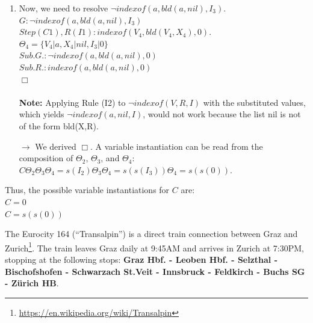 \documentclass[10pt, a4paper]{article}
\begin{document}
\begin{enumerate}
    \item Now, we need to resolve $\neg indexof(a, bld(a, nil), I_3)$. \\
    $G: \neg indexof(a, bld(a, nil), I_3)$ \\
    $Step(C1), R(I1): indexof(V_4, bld(V_4, X_4), 0).$ \\
    $\Theta_4 = \{V_4 | a, X_4 | nil, I_3 | 0\}$ \\
    $Sub.G.: \neg indexof(a, bld(a, nil), 0)$ \\
    $Sub.R.: indexof(a, bld(a, nil), 0) $ \\
    $\Box$ \\
    \\
    
  \textbf{Note: }Applying Rule (I2) to $\neg indexof(V,R,I)$ with the substituted values, which yields  $\neg indexof(a,nil,I)$, would not work because the list nil is not of the form bld(X,R).
    
 $\rightarrow$ We derived $\Box$. A variable instantiation can be read from the composition of $\Theta_2$, $\Theta_3$, and $\Theta_4$: \\
 $C\Theta_2\Theta_3\Theta_4 = s(I_2)\Theta_3\Theta_4 = s(s(I_3))\Theta_4 = s(s(0))$.

\end{enumerate}

Thus, the possible variable instantiations for $C$ are: \\
$C=0$ \\
$C=s(s(0))$






The Eurocity 164 (“Transalpin”) is a direct train connection between Graz and Zurich\footnote{\url{https://en.wikipedia.org/wiki/Transalpin}}. The train leaves Graz daily at 9:45AM and arrives in Zurich at 7:30PM, stopping at the following stops: \textbf{Graz Hbf. - Leoben Hbf. - Selzthal - Bischofshofen - Schwarzach St.Veit - Innsbruck - Feldkirch - Buchs SG - Zürich HB}.
\end{document}
